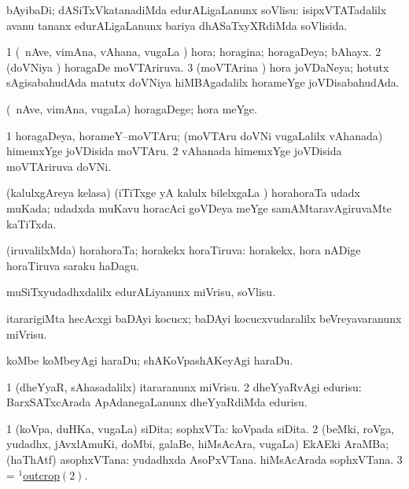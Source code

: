 \bentry
{}
\gl{\sakirx}
\bmng
bAyibaDi; dASiTxVkatanadiMda edurALigaLanunx soVlisu:  isipxVTATadalilx avanu tananx edurALigaLanunx bariya dhASaTxyXRdiMda soVlisida. 
\emng
\eentry

\bentry
{}
\gl{\gu}
\bmng
\bnum
\num{1} (\kanmu\ nAve, vimAna, vAhana, \mo vugaLa \vi) hora; horagina; horagaDeya; bAhayx. 
\num{2} (doVNiya \vi) horagaDe moVTAriruva. 
\num{3} (moVTArina \vi) hora joVDaNeya; hotutx sAgisabahudAda matutx doVNiya hiMBAgadalilx horameYge joVDisabahudAda. 
\enum
\emng
\eentry

\bentry
{}
\gl{\kirxvi}
\bmng
(\kanmu\ nAve, vimAna, \mo vugaLa) horagaDege; hora meYge. 
\emng
\eentry

\bentry
{}
\gl{\nA}
\bmng
\bnum
\num{1} horagaDeya, horameY--moVTAru; (moVTAru doVNi \mo vugaLalilx vAhanada) himemxYge joVDisida moVTAru. 
\num{2} vAhanada himemxYge joVDisida moVTAriruva doVNi. 
\enum
\emng
\eentry

\bentry
{}
\gl{\gu}
\bmng
(kalulxgAreya kelasa) (iTiTxge yA kalulx bilelxgaLa \vi) horahoraTa udadx muKada; udadxda muKavu horacAci goVDeya meYge samAMtaravAgiruvaMte kaTiTxda. 
\emng
\eentry

\bentry
{}
\gl{\gu}
\bmng
(iruvalilxMda) horahoraTa; horakekx horaTiruva:  horakekx, hora nADige horaTiruva saraku haDagu. 
\emng
\eentry

\bentry
{}
\gl{\sakirx}
\bmng
muSiTxyudadhxdalilx edurALiyanunx miVrisu, soVlisu. 
\emng
\eentry


\bentry
{}
\gl{\sakirx}
\bmng
itararigiMta hecAcxgi baDAyi kocucx; baDAyi kocucxvudaralilx beVreyavaranunx miVrisu. 
\emng
\eentry

\bentry
{}
\gl{\akirx}
\bmng
koMbe koMbeyAgi haraDu; shAKoVpashAKeyAgi haraDu. 
\emng
\eentry

\bentry
{}
\gl{\sakirx}
\bmng
\bnum
\num{1} (dheYyaR, sAhasadalilx) itararanunx miVrisu. 
\num{2} dheYyaRvAgi edurisu:  BarxSATxcArada ApAdanegaLanunx dheYyaRdiMda edurisu. 
\enum
\emng
\eentry

\bentry
{}
\gl{\nA}
\bmng
\bnum
\num{1} (koVpa, duHKa, \mo vugaLa) siDita; sophxVTa:  koVpada siDita. 
\num{2} (beMki, roVga, yudadhx, jAvxlAmuKi, doMbi, galaBe, hiMsAcAra, \mo vugaLa) EkAEki AraMBa; (haThAtf) asophxVTana:  yudadhxda AsoPxVTana.  hiMsAcArada sophxVTana. 
\num{3} = \hyperlink{outcrop(1)2}{$^1$outcrop\((2)\)}. 
\enum
\emng
\eentry

